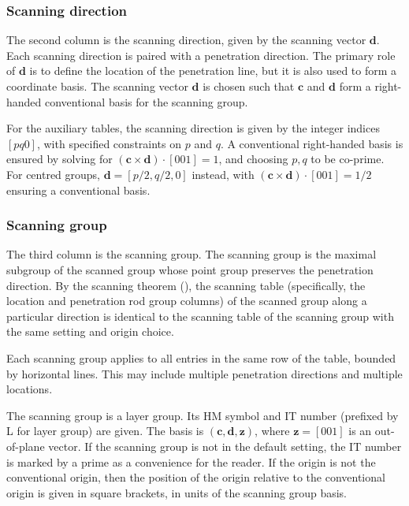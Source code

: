 \subsubsection{Scanning direction}

The second column is the scanning direction, given by the scanning vector $\mathbf{d}$.
Each scanning direction is paired with a penetration direction.
The primary role of $\mathbf{d}$ is to define the location of the penetration line, but it is also used to form a coordinate basis.
The scanning vector $\mathbf{d}$ is chosen such that $\mathbf{c}$ and $\mathbf{d}$ form a right-handed conventional basis for the scanning group.

For the auxiliary tables, the scanning direction is given by the integer indices $[pq0]$, with specified constraints on $p$ and $q$.
A conventional right-handed basis is ensured by solving for $(\mathbf{c}\times\mathbf{d})\cdot[001]=1$, and choosing $p,q$ to be co-prime.
For centred groups, $\mathbf{d}=[p/2,q/2,0]$ instead, with $(\mathbf{c}\times\mathbf{d})\cdot[001]=1/2$ ensuring a conventional basis.


\subsubsection{Scanning group}

The third column is the scanning group.
The scanning group is the maximal subgroup of the scanned group whose point group preserves the penetration direction.
By the scanning theorem (\cite{kopsky_scanning_1989}), the scanning table (specifically, the location and penetration rod group columns) of the scanned group along a particular direction is identical to the scanning table of the scanning group with the same setting and origin choice.

Each scanning group applies to all entries in the same row of the table, bounded by horizontal lines.
This may include multiple penetration directions and multiple locations.

The scanning group is a layer group.
Its HM symbol and IT number (prefixed by L for layer group) are given.
The basis is $(\mathbf{c},\mathbf{d},\mathbf{z})$, where $\mathbf{z}=[001]$ is an out-of-plane vector.
If the scanning group is not in the default setting, the IT number is marked by a prime as a convenience for the reader.
If the origin is not the conventional origin, then the position of the origin relative to the conventional origin is given in square brackets, in units of the scanning group basis.

